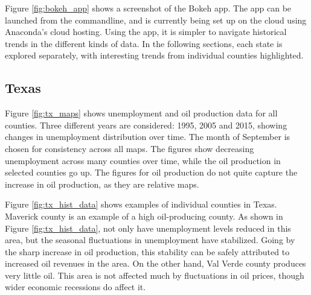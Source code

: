 \documentclass[11pt,letterpaper]{article}
\begin{document}
Figure \ref{fig:bokeh_app} shows a screenshot of the Bokeh app. The app can be launched from the commandline, and is currently being set up on the cloud using Anaconda's cloud hosting. Using the app, it is simpler to navigate historical trends in the different kinds of data. In the following sections, each state is explored separately, with interesting trends from individual counties highlighted.


\subsection{Texas}

Figure \ref{fig:tx_maps} shows unemployment and oil production data for all counties. Three different years are considered: 1995, 2005 and 2015, showing changes in unemployment distribution over time. The month of September is chosen for consistency across all maps. The figures show decreasing unemployment across many counties over time, while the oil production in selected counties go up. The figures for oil production do not quite capture the increase in oil production, as they are relative maps. 

Figure \ref{fig:tx_hist_data} shows examples of individual counties in Texas. Maverick county is an example of a high oil-producing county. As shown in Figure \ref{fig:tx_hist_data}, not only have unemployment levels reduced in this area, but the seasonal fluctuations in unemployment have stabilized. Going by the sharp increase in oil production, this stability can be safely attributed to increased oil revenues in the area. On the other hand, Val Verde county produces very little oil. This area is not affected much by fluctuations in oil prices, though wider economic recessions do affect it.
\end{document}
